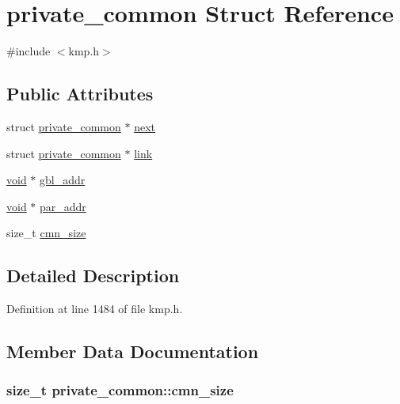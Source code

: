 \hypertarget{structprivate__common}{\section{private\-\_\-common Struct Reference}
\label{structprivate__common}
}


{\ttfamily \#include $<$kmp.\-h$>$}

\subsection*{Public Attributes}
\begin{DoxyCompactItemize}
\item 
struct \hyperlink{structprivate__common}{private\-\_\-common} $\ast$ \hyperlink{structprivate__common_a9bbe15e09efcd5af8f569dc983a661bc}{next}
\item 
struct \hyperlink{structprivate__common}{private\-\_\-common} $\ast$ \hyperlink{structprivate__common_aaf53273197788a197d0c0498d36ce8f4}{link}
\item 
\hyperlink{ittnotify__static_8h_af941d56e55e3c5465135b60c4d6343ed}{void} $\ast$ \hyperlink{structprivate__common_a3568f36c1e149d053e57e9245b93cc1d}{gbl\-\_\-addr}
\item 
\hyperlink{ittnotify__static_8h_af941d56e55e3c5465135b60c4d6343ed}{void} $\ast$ \hyperlink{structprivate__common_af830d32951feb25766b1ed8b973035fe}{par\-\_\-addr}
\item 
size\-\_\-t \hyperlink{structprivate__common_a3432e13f45e79ec4d2ccb6bbd9d94256}{cmn\-\_\-size}
\end{DoxyCompactItemize}


\subsection{Detailed Description}


Definition at line 1484 of file kmp.\-h.



\subsection{Member Data Documentation}
\hypertarget{structprivate__common_a3432e13f45e79ec4d2ccb6bbd9d94256}{
\subsubsection[{cmn\-\_\-size}]{\setlength{\rightskip}{0pt plus 5cm}size\-\_\-t private\-\_\-common\-::cmn\-\_\-size}}\label{structprivate__common_a3432e13f45e79ec4d2ccb6bbd9d94256}


